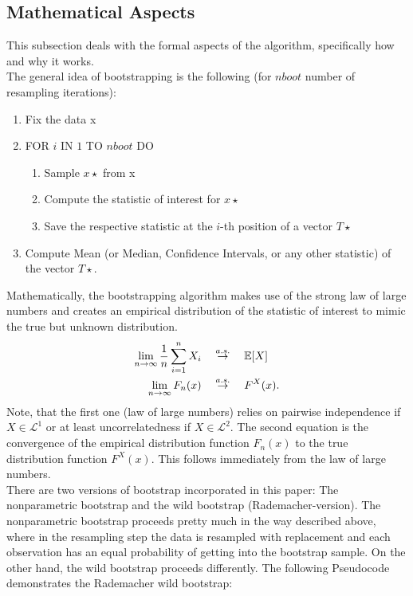 \subsection{Mathematical Aspects}
This subsection deals with the formal aspects of the algorithm, specifically how and why it works.\\
The general idea of bootstrapping is the following (for $nboot$ number of resampling iterations):
\begin{enumerate}
	\item Fix the data x
	\item FOR $i$ IN $1$ TO $nboot$ DO
	 \begin{enumerate}
		\item Sample $x\star$ from x
		\item Compute the statistic of interest for $x\star$
		\item Save the respective statistic at the $i$-th position of a vector $T\star$
	\end{enumerate}
	\item Compute Mean (or Median, Confidence Intervals, or any other statistic) of the vector $T\star$.
\end{enumerate}
Mathematically, the bootstrapping algorithm makes use of the strong law of large numbers and creates an empirical distribution of the statistic of interest to mimic the true but unknown distribution.
\begin{align*}
	\lim_{n \to \infty} \frac{1}{n}\sum_{i=1}^n X_i \quad &\stackrel{a.s.}{\to} \quad \mathbb{E}[X] \\
	\lim_{n \to \infty} F_n(x) \quad &\stackrel{a.s.}{\to} \quad F^X(x).
\end{align*}
Note, that the first one (law of large numbers) relies on pairwise independence if $X \in \mathcal{L}^1$ or at least uncorrelatedness if $X \in \mathcal{L}^2$. The second equation is the convergence of the empirical distribution function $F_n(x)$ to the true distribution function $F^X(x)$. This follows immediately from the law of large numbers.\\
There are two versions of bootstrap incorporated in this paper: The nonparametric bootstrap and the wild bootstrap (Rademacher-version). The nonparametric bootstrap proceeds pretty much in the way described above, where in the resampling step the data is resampled with replacement and each observation has an equal probability of getting into the bootstrap sample. On the other hand, the wild bootstrap proceeds differently. The following Pseudocode demonstrates the Rademacher wild bootstrap:
